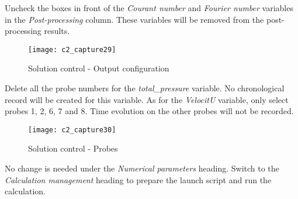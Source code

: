 Uncheck the boxes in front of the {\itshape Courant number} and {\itshape
Fourier number} variables in the {\itshape Post-processing} column. These
variables will be removed from the post-processing results.

\begin{figure}[h!]
\begin{center}
\texttt{[image: c2\_capture29]}
\caption{Solution control - Output configuration}
\label{fig29_e2}
\end{center}
\end{figure}


\newpage
Delete all the probe numbers for the {\itshape total\_pressure} variable. No
chronological record will be created for this variable. As for the
{\itshape VelocitU} variable, only select probes  1, 2, 6, 7 and 8. Time
evolution on the other probes will not be recorded.

\begin{figure}[h!]
\begin{center}
\texttt{[image: c2\_capture30]}
\caption{Solution control - Probes}
\label{fig30_e2}
\end{center}
\end{figure}


No change is needed under the {\itshape Numerical parameters} heading.
Switch to the {\itshape Calculation management} heading to prepare the launch
script and run the calculation.

